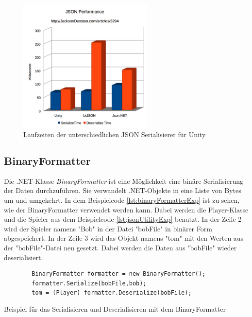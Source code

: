 \begin{figure}[htp]
    \centering
    \includegraphics[width=0.6\textwidth]{images/UnityJsonPerformance.png}
    \caption{Laufzeiten der unterschiedlichen JSON Serialisierer für Unity \cite{jacksondunstanJacksonDunstancomJSON}}
    \label{fig:unityJsonPerformance}
\end{figure}

\subsection{BinaryFormatter}\label{ssec:binaryFormatter}
Die .NET-Klasse \textit{BinaryFormatter} ist eine Möglichkeit eine binäre Serialisierung der Daten durchzuführen. Sie verwandelt .NET-Objekte in eine Liste von Bytes um und umgekehrt. In dem Beispielcode \ref{lst:binaryFormatterExp} ist zu sehen, wie der BinaryFormatter verwendet werden kann. Dabei werden die Player-Klasse und die Spieler aus dem Beispielcode \ref{lst:jsonUtilityExp} benutzt. In der Zeile 2 wird der Spieler namens "Bob" in der Datei "bobFile" in binärer Form abgespeichert. In der Zeile 3 wird das Objekt namens "tom" mit den Werten aus der "bobFile"-Datei neu gesetzt. Dabei werden die Daten aus "bobFile" wieder deserialisiert.\cite{microsoftBinaryFormatterClass} 

\begin{listing}[htp]
    \begin{verbatim} 
        BinaryFormatter formatter = new BinaryFormatter();
        formatter.Serialize(bobFile,bob);
        tom = (Player) formatter.Deserialize(bobFile);
    \end{verbatim}
    \caption{Beispiel für das Serialisieren und Deserialisieren mit dem BinaryFormatter}
    \label{lst:binaryFormatterExp}
\end{listing}


